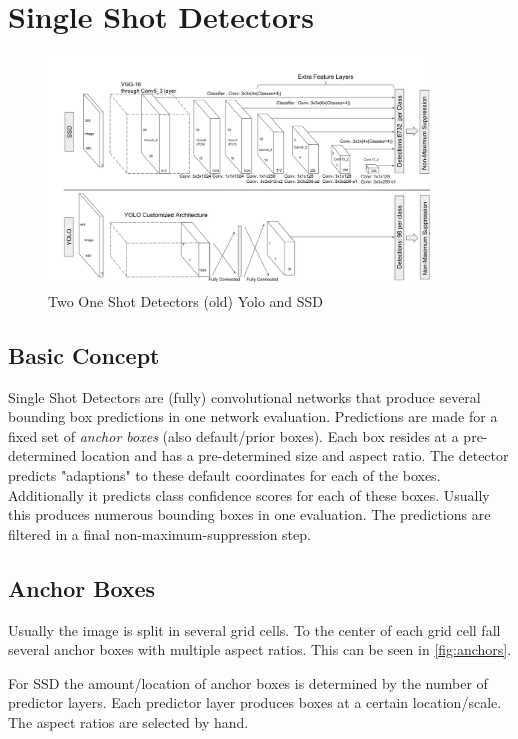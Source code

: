 	\section{Single Shot Detectors}
	\begin{figure}[h]
		\includegraphics[width=0.9\textwidth]{fig/architecture}
		\caption{Two One Shot Detectors (old) Yolo and SSD \cite{Liu}}
		\label{fig:architecture}
	\end{figure}
	
	\subsection{Basic Concept}
	Single Shot Detectors are (fully) convolutional networks that produce several bounding box predictions in one network evaluation. Predictions are made for a fixed set of \textit{anchor boxes} (also default/prior boxes). Each box resides at a pre-determined location and has a pre-determined size and aspect ratio. The detector predicts "adaptions" to these default coordinates for each of the boxes. Additionally it predicts class confidence scores for each of these boxes. Usually this produces numerous bounding boxes in one evaluation. The predictions are filtered in a final non-maximum-suppression step.
	
	\subsection{Anchor Boxes}
	Usually the image is split in several grid cells. To the center of each grid cell fall several anchor boxes with multiple aspect ratios. This can be seen in \autoref{fig:anchors}.
	
	For SSD the amount/location of anchor boxes is determined by the number of predictor layers. Each predictor layer produces boxes at a certain location/scale. The aspect ratios are selected by hand. 
	
